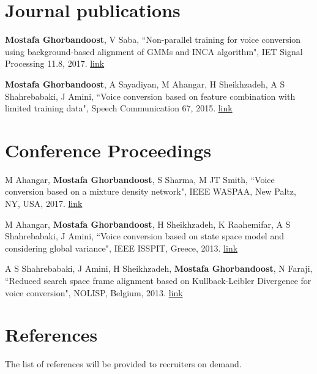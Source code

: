 \documentclass[letterpaper,11pt]{article}
\begin{document}
\vspace{-25pt}


\section{Journal publications}
\begin{enumerate}[noitemsep, leftmargin=*,label={[\arabic*]}]
\item{\textbf{Mostafa Ghorbandoost}, V Saba, ``Non-parallel training for voice conversion using background-based alignment of GMMs and INCA algorithm", IET Signal Processing 11.8, 2017. \href{https://ietresearch.onlinelibrary.wiley.com/doi/10.1049/iet-spr.2016.0693}{link}}
\vspace{5pt}
\item{\textbf{Mostafa Ghorbandoost}, A Sayadiyan, M Ahangar, H Sheikhzadeh, A S Shahrebabaki, J Amini, ``Voice conversion based on feature combination with limited training data", Speech Communication 67, 2015. \href{https://www.sciencedirect.com/science/article/abs/pii/S0167639314000892}{link}}
\end{enumerate}

\section{Conference Proceedings}
\begin{enumerate}[noitemsep, leftmargin=*,label={[\arabic*]}]
\item{M Ahangar, \textbf{Mostafa Ghorbandoost}, S Sharma, M JT Smith, ``Voice conversion based on a mixture density network", IEEE WASPAA, New Paltz, NY, USA, 2017. \href{https://ieeexplore.ieee.org/document/8170049}{link}}
\vspace{5pt}
\item{M Ahangar, \textbf{Mostafa Ghorbandoost}, H Sheikhzadeh, K Raahemifar, A S Shahrebabaki, J Amini, ``Voice conversion based on state space model and considering global variance", IEEE ISSPIT, Greece, 2013. \href{https://ieeexplore.ieee.org/document/6781917}{link}}
\vspace{5pt}
\item{A S Shahrebabaki, J Amini, H Sheikhzadeh, \textbf{Mostafa Ghorbandoost}, N Faraji, ``Reduced search space frame alignment based on Kullback-Leibler Divergence for voice conversion", NOLISP, Belgium, 2013. \href{https://link.springer.com/chapter/10.1007/978-3-642-38847-7_11}{link}}
\end{enumerate}


\section{References}
The list of references will be provided to recruiters on demand.

\end{document}
